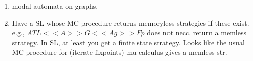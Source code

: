 \documentclass[a4paper,10pt]{article}
\begin{document}
\begin{enumerate}
\item modal automata on graphs.

\item Have a SL whose MC procedure returns memoryless strategies if these exist.
e.g., $ATL <<A>>G<<Ag>>Fp$ does not necc. return a memless strategy.
In SL, at least you get a finite state strategy.
Looks like the usual MC procedure for (iterate fixpoints) mu-calculus gives a memless str.
\end{enumerate}
\end{document}
